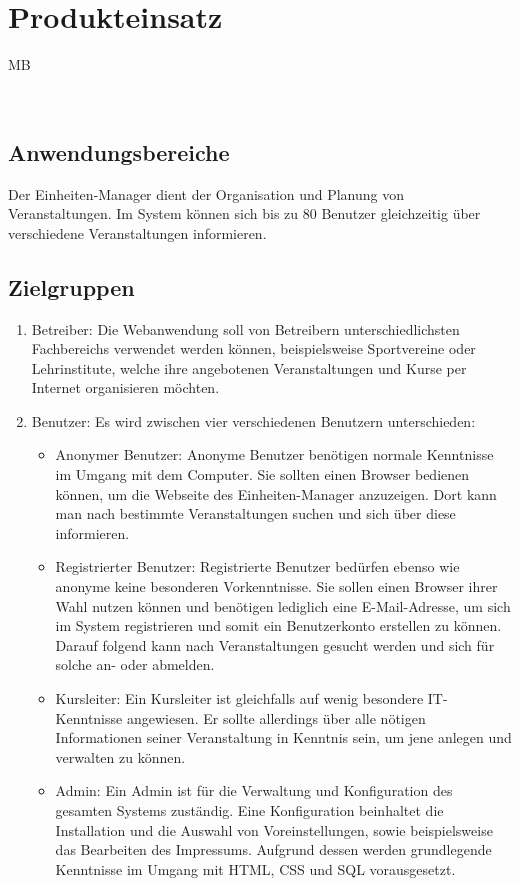 \documentclass[a4paper]{scrreprt}
\begin{document}
  
\chapter{Produkteinsatz}
	\begin{tiny}
		MB
	\end{tiny}\\

    \section{Anwendungsbereiche}
		 Der \gls{Einheiten}-Manager dient der Organisation und Planung von Veranstaltungen. Im System können sich bis zu 80 Benutzer gleichzeitig über verschiedene Veranstaltungen informieren.   
     
	\section{Zielgruppen}
		 \begin{enumerate}
		 	\item Betreiber: Die Webanwendung soll von Betreibern unterschiedlichsten Fachbereichs verwendet werden können, beispielsweise Sportvereine oder Lehrinstitute, welche ihre angebotenen Veranstaltungen und Kurse per Internet organisieren möchten.
		 	\item Benutzer: Es wird zwischen vier verschiedenen Benutzern unterschieden:
		 	\begin{itemize}
		 		\item Anonymer Benutzer: Anonyme Benutzer benötigen normale Kenntnisse im Umgang mit dem Computer. Sie sollten einen \gls{Browser} bedienen können, um die Webseite des \gls{Einheiten}-Manager anzuzeigen. Dort kann man nach bestimmte Veranstaltungen suchen und sich über diese informieren.
		 		\item Registrierter Benutzer: Registrierte Benutzer bedürfen ebenso wie anonyme keine besonderen Vorkenntnisse. Sie sollen einen \gls{Browser} ihrer Wahl nutzen können und benötigen lediglich eine E-Mail-Adresse, um sich im System registrieren und somit ein Benutzerkonto erstellen zu können. Darauf folgend kann nach Veranstaltungen gesucht werden und sich für solche an- oder abmelden.
		 		\item Kursleiter: Ein Kursleiter ist gleichfalls auf wenig besondere IT-Kenntnisse angewiesen. Er sollte allerdings über alle nötigen Informationen seiner Veranstaltung in Kenntnis sein, um jene anlegen und verwalten zu können.
		 		\item \gls{Admin}: Ein \gls{Admin} ist für die Verwaltung und \gls{Konfiguration} des gesamten Systems zuständig. Eine Konfiguration beinhaltet die Installation und die Auswahl von Voreinstellungen, sowie beispielsweise das Bearbeiten des Impressums. Aufgrund dessen werden grundlegende Kenntnisse im Umgang mit HTML, CSS und SQL vorausgesetzt.
		 	\end{itemize}	
		 \end{enumerate}  
        
\end{document}
